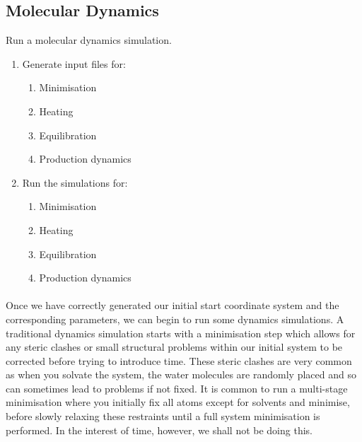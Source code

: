 \subsection{Molecular Dynamics}

    \begin{task}[label=task:Dynamics]{Run a molecular dynamics simulation.}
        \begin{enumerate}[label=(\alph*)]
            \item Generate input files for:
            \begin{enumerate}[label=(\roman*)]
                \item Minimisation
                \item Heating
                \item Equilibration
                \item Production dynamics
            \end{enumerate}
            \item Run the simulations for:
            \begin{enumerate}[label=(\roman*)]
                \item Minimisation
                \item Heating
                \item Equilibration
                \item Production dynamics
            \end{enumerate}
        \end{enumerate}
    \end{task}


    \paragraph{}
        Once we have correctly generated our initial start coordinate system and the corresponding parameters, we can begin to run some dynamics simulations. A traditional dynamics simulation starts with a minimisation step which allows for any steric clashes or small structural problems within our initial system to be corrected before trying to introduce time. These steric clashes are very common as when you solvate the system, the water molecules are randomly placed and so can sometimes lead to problems if not fixed. It is common to run a multi-stage minimisation where you initially fix all atoms except for solvents and minimise, before slowly relaxing these restraints until a full system minimisation is performed. In the interest of time, however, we shall not be doing this.


